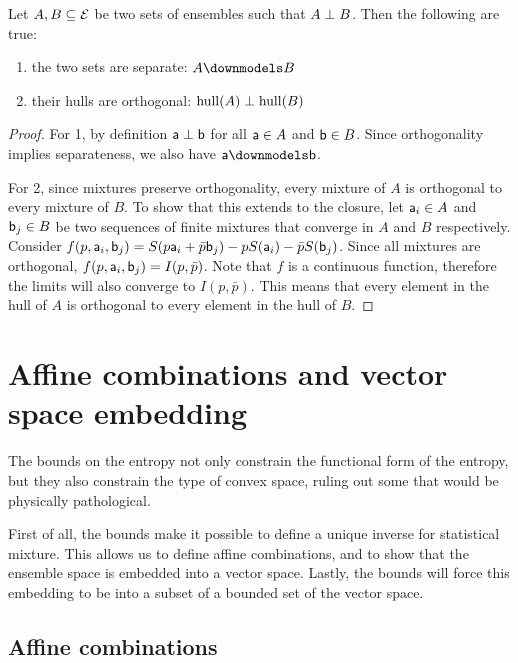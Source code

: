 \begin{mathSection}
\begin{prop}
	Let $A, B \subseteq \Ens$ be two sets of ensembles such that $A \ortho B$. Then the following are true:
	\begin{enumerate}
		\item the two sets are separate: $A \separate B$
		\item their hulls are orthogonal: $\hull(A) \ortho \hull(B)$
	\end{enumerate}
\end{prop}

\begin{proof}
	For 1, by definition $\ens[a] \ortho \ens[b]$ for all $\ens[a] \in A$ and $\ens[b] \in B$. Since orthogonality implies separateness, we also have $\ens[a] \separate \ens[b]$.
	
	For 2, since mixtures preserve orthogonality, every mixture of $A$ is orthogonal to every mixture of $B$. To show that this extends to the closure, let $\ens[a]_i \in A$ and $\ens[b]_j \in B$ be two sequences of finite mixtures that converge in $A$ and $B$ respectively. Consider $f(p,\ens[a]_i, \ens[b]_j) = S(p \ens[a]_i + \bar{p} \ens[b]_j) - p S(\ens[a]_i) - \bar{p} S(\ens[b]_j)$. Since all mixtures are orthogonal, $f(p,\ens[a]_i, \ens[b]_j) = I(p,\bar{p})$. Note that $f$ is a continuous function, therefore the limits will also converge to $I(p,\bar{p})$. This means that every element in the hull of $A$ is orthogonal to every element in the hull of $B$.
\end{proof}
\end{mathSection}

\section{Affine combinations and vector space embedding}

The bounds on the entropy not only constrain the functional form of the entropy, but they also constrain the type of convex space, ruling out some that would be physically pathological.

First of all, the bounds make it possible to define a unique inverse for statistical mixture. This allows us to define affine combinations, and to show that the ensemble space is embedded into a vector space. Lastly, the bounds will force this embedding to be into a subset of a bounded set of the vector space.

\subsection{Affine combinations}

